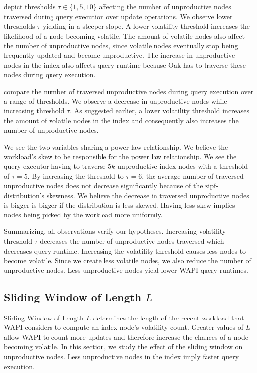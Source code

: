 \documentclass[abstracton,12pt]{scrartcl}
\theoremstyle{definition}
\begin{document}
depict thresholds $\tau \in \{1,5,10\}$ affecting the number of unproductive
nodes traversed during query execution over update operations. We observe lower
thresholds $\tau$ yielding in a steeper slope.
A lower volatility threshold increases the likelihood of a node
becoming volatile. The amount of volatile nodes also affect the number of
unproductive nodes, since volatile nodes eventually stop being frequently
updated and become unproductive. The increase in unproductive nodes in the index
also affects query runtime because Oak has to traverse these nodes during
query execution.

 compare the
number of traversed unproductive nodes during query execution over a range of
thresholds. We observe a decrease in unproductive nodes while increasing
threshold $\tau$. 
As suggested earlier, a lower volatility threshold
increases the amount of volatile nodes in the index and consequently also
increases the number of unproductive nodes. 

We see the two variables sharing a power law relationship. We believe the
workload's skew to be responsible for the power law relationship. We see
the query executor having to traverse $5k$ unproductive index nodes with a
threshold of $\tau = 5$. By increasing the threshold to $\tau = 6$, the average
number of traversed unproductive nodes does not decrease significantly because
of the zipf-distribution's skewness. We believe the decrease in traversed unproductive
nodes is bigger is bigger if the
distribution is less skewed. Having less skew implies nodes being picked
by the workload more uniformly.

Summarizing, all observations verify our hypotheses.
Increasing volatility threshold $\tau$ decreases the number of unproductive
nodes traversed which decreases query runtime. Increasing the volatility
threshold causes less nodes to become volatile. Since we create less volatile
nodes, we also reduce the number of unproductive nodes. Less unproductive
nodes yield lower WAPI query runtimes. 

\subsection{Sliding Window of Length $L$}

\label{sec:sliding-window}

Sliding Window of Length $L$ determines the length of the recent workload that WAPI
considers to compute an index node's volatility count. Greater values of $L$
allow WAPI to count more updates and therefore increase the chances of a node
becoming volatile. In this section, we study
the effect of the sliding window on unproductive nodes.
Less unproductive nodes in the index imply faster query execution.
\end{document}
